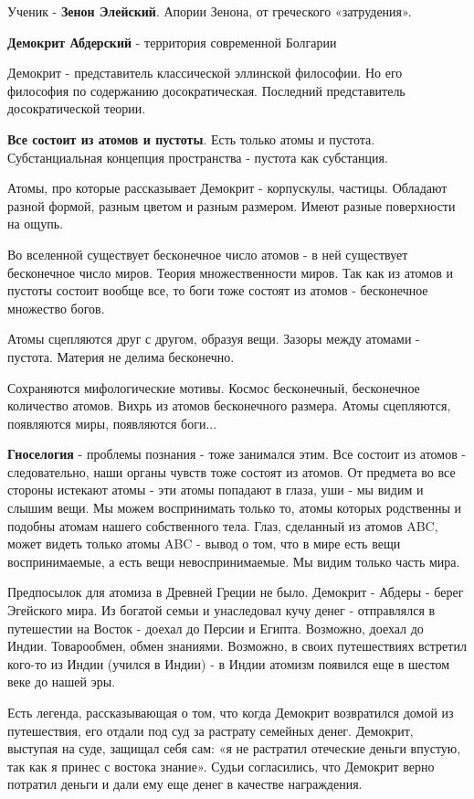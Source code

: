\documentclass{article}
\begin{document}
\begin{flushleft}
Ученик - \textbf{Зенон Элейский}. Апории Зенона, от греческого «затрудения».

\hfill

\textbf{Демокрит Абдерский} - территория современной Болгарии

Демокрит - представитель классической эллинской философии. Но его философия по содержанию досократическая. Последний представитель досократической теории.

\hfill

\textbf{Все состоит из атомов и пустоты}. Есть только атомы и пустота. Субстанциальная концепция пространства - пустота как субстанция.

\hfill

Атомы, про которые рассказывает Демокрит - корпускулы, частицы. Обладают разной формой, разным цветом и разным размером. Имеют разные поверхности на ощупь.

\hfill

Во вселенной существует бесконечное число атомов - в ней существует бесконечное число миров. Теория множественности миров. Так как из атомов и пустоты состоит вообще все, то боги тоже состоят из атомов - бесконечное множество богов.

\hfill

Атомы сцепляются друг с другом, образуя вещи. Зазоры между атомами - пустота. Материя не делима бесконечно. 

Сохраняются мифологические мотивы. Космос бесконечный, бесконечное количество атомов. Вихрь из атомов бесконечного размера. Атомы сцепляются, появляются миры, появляются боги...

\hfill

\textbf{Гноселогия} - проблемы познания - тоже занимался этим. Все состоит из атомов - следовательно, наши органы чувств тоже состоят из атомов. От предмета во все стороны истекают атомы - эти атомы попадают в глаза, уши - мы видим и слышим вещи. Мы можем воспринимать только то, атомы которых родственны и подобны атомам нашего собственного тела. Глаз, сделанный из атомов ABC, может видеть только атомы ABC - вывод о том, что в мире есть вещи воспринимаемые, а есть вещи невоспринимаемые. Мы видим только часть мира.

\hfill

Предпосылок для атомиза в Древней Греции не было. Демокрит - Абдеры - берег Эгейского мира. Из богатой семьи и унаследовал кучу денег - отправлялся в путешестии на Восток - доехал до Персии и Египта. Возможно, доехал до Индии. Товарообмен, обмен знаниями. Возможно, в своих путешествиях встретил кого-то из Индии (учился в Индии) - в Индии атомизм появился еще в шестом веке до нашей эры.

\hfill

Есть легенда, рассказывающая о том, что когда Демокрит возвратился домой из путешествия, его отдали под суд за растрату семейных денег. Демокрит, выступая на суде, защищал себя сам: «я не растратил отеческие деньги впустую, так как я принес с востока знание». Судьи согласились, что Демокрит верно потратил деньги и дали ему еще денег в качестве награждения.

\end{flushleft}
\end{document}
